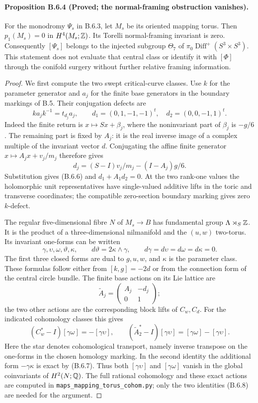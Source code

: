 \paragraph{Proposition B.6.4 (Proved; the normal-framing obstruction vanishes).}
For the monodromy $\Psi_s$ in B.6.3, let $M_s$ be its oriented mapping
torus. Then $p_1(M_s)=0$ in $H^4(M_s;\mathbb Z)$. Its Torelli
normal-framing invariant is zero. Consequently $[\Psi_s]$ belongs
to the injected subgroup $\Theta_7$ of
$\pi_0\operatorname{Diff}^+(S^3\times S^3)$.
This statement does not evaluate that central class or identify it
with $[\Phi]$ through the conifold surgery without further relative
framing information.
\begin{proof}
We first compute the two swept critical-curve classes. Use $k$ for
the parameter generator and $a_j$ for the finite base generators in
the boundary markings of B.5. Their conjugation defects are
\[
 k a_j k^{-1}=t_{d_j}a_j,\qquad
 d_1=(0,1,-1,-1)^t,\quad d_2=(0,0,-1,1)^t.
 \tag{B.6.6}
\]
Indeed the finite return is $x\mapsto Sx+\beta_j$, where the
noninvariant part of $\beta_j$ is $-g/6$. The remaining part is
fixed by $A_j$: it is the real inverse image of a complex multiple
of the invariant vector $d$. Conjugating the affine finite generator
$x\mapsto A_jx+v_j/m_j$ therefore gives
\[
 d_j=(S-I)v_j/m_j-(I-A_j)g/6.
\]
Substitution gives (B.6.6) and $d_1+A_1d_2=0$. At the two
rank-one values the holomorphic unit representatives have
single-valued additive lifts in the toric and transverse coordinates;
the compatible zero-section boundary marking gives zero $k$-defect.

The regular five-dimensional fibre $N$ of $M_s\to B$ has fundamental
group $\Lambda\rtimes_S\mathbb Z$. It is the product of a three-dimensional
nilmanifold and the $(u,w)$ two-torus. Its invariant one-forms can be
written
\[
 \gamma,\upsilon,\omega,\vartheta,\kappa,
 \qquad d\vartheta=2\kappa\wedge\gamma,
 \qquad d\gamma=d\upsilon=d\omega=d\kappa=0.
 \tag{B.6.7}
\]
The first three closed forms are dual to $g,u,w$, and $\kappa$ is
the parameter class. These formulas follow either from
$[k,g]=-2d$ or from the connection form of the central circle bundle.
The finite base actions on its Lie lattice are
\[
 \widetilde A_j=
 \begin{pmatrix}A_j&-d_j\\0&1\end{pmatrix};
\]
the two other actions are the corresponding block lifts of $C_w,C_d$.
For the indicated cohomology classes this gives
\[
 (C_w^*-I)[\gamma\omega]=-[\gamma\upsilon],\qquad
 (\widetilde A_2^*-I)[\gamma\upsilon]
       =[\gamma\omega]-[\gamma\upsilon].
 \tag{B.6.8}
\]
Here the star denotes cohomological transport, namely inverse
transpose on the one-forms in the chosen homology marking.
In the second identity the additional form $-\gamma\kappa$ is
exact by (B.6.7). Thus both $[\gamma\upsilon]$ and
$[\gamma\omega]$ vanish in the global coinvariants of $H^2(N;\mathbb Q)$.
The full rational cohomology and these exact actions are computed in
\texttt{maps\_mapping\_torus\_cohom.py}; only the two identities
(B.6.8) are needed for the argument.


\end{proof}

